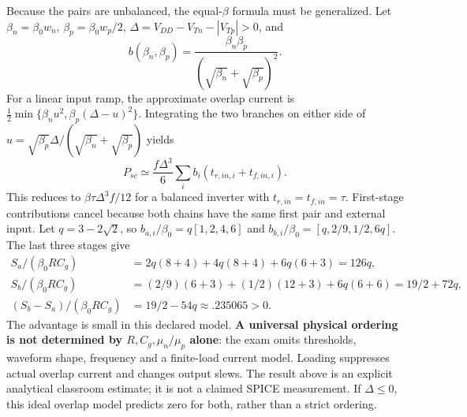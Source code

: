 \documentclass[10pt]{article}
\begin{document}
Because the pairs are unbalanced, the equal-$\beta$ formula must be generalized. Let $\beta_n=\beta_0w_n$, $\beta_p=\beta_0w_p/2$, $\Delta=V_{DD}-V_{Tn}-|V_{Tp}|>0$, and
\[b(\beta_n,\beta_p)=\frac{\beta_n\beta_p}{(\sqrt{\beta_n}+\sqrt{\beta_p})^2}.\]
For a linear input ramp, the approximate overlap current is $\tfrac12\min\{\beta_n u^2,\beta_p(\Delta-u)^2\}$. Integrating the two branches on either side of $u=\sqrt{\beta_p}\Delta/(\sqrt{\beta_n}+\sqrt{\beta_p})$ yields
\[P_{sc}\simeq\frac{f\Delta^3}{6}\sum_i b_i(t_{r,in,i}+t_{f,in,i}).\]
This reduces to $\beta\tau\Delta^3f/12$ for a balanced inverter with $t_{r,in}=t_{f,in}=\tau$. First-stage contributions cancel because both chains have the same first pair and external input. Let $q=3-2\sqrt2$, so $b_{a,i}/\beta_0=q[1,2,4,6]$ and $b_{b,i}/\beta_0=[q,2/9,1/2,6q]$. The last three stages give
\begin{align*}
S_a/(\beta_0RC_g)&=2q(8+4)+4q(8+4)+6q(6+3)=126q,\\
S_b/(\beta_0RC_g)&=(2/9)(6+3)+(1/2)(12+3)+6q(6+6)=19/2+72q,\\
(S_b-S_a)/(\beta_0RC_g)&=19/2-54q\approx .235065>0.
\end{align*}
The advantage is small in this declared model.  \textbf{A universal physical ordering is not determined by $R,C_g,\mu_n/\mu_p$ alone}: the exam omits thresholds, waveform shape, frequency and a finite-load current model. Loading suppresses actual overlap current and changes output slews. The result above is an explicit analytical classroom estimate; it is not a claimed SPICE measurement. If $\Delta\le0$, this ideal overlap model predicts zero for both, rather than a strict ordering.
\end{document}
